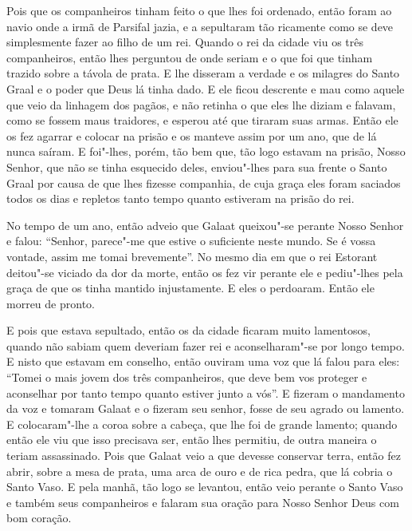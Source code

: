 Pois que os companheiros tinham feito o que lhes foi ordenado, então foram ao
navio onde a irmã de Parsifal jazia, e a sepultaram tão ricamente como se deve
simplesmente fazer ao filho de um rei. Quando o rei da cidade viu os três
companheiros, então lhes perguntou de onde seriam e o que foi que tinham
trazido sobre a távola de prata. E lhe disseram a verdade e os milagres do
Santo Graal e o poder que Deus lá tinha dado. E ele ficou descrente e mau como
aquele que veio da linhagem dos pagãos, e não retinha o que eles lhe diziam e
falavam, como se fossem maus traidores, e esperou até que tiraram suas armas. 
Então ele os fez agarrar e colocar na prisão e os manteve assim por um ano, que
de lá nunca saíram. E foi"-lhes, porém, tão bem que, tão logo estavam na prisão,
Nosso Senhor, que não se tinha esquecido deles, enviou"-lhes para sua frente o
Santo Graal por causa de que lhes fizesse companhia, de cuja graça eles foram
saciados todos os dias e repletos tanto tempo quanto estiveram na prisão do
rei.

No tempo de um ano, então adveio que Galaat queixou"-se perante Nosso Senhor e
falou: “Senhor, parece"-me que estive o suficiente neste mundo. Se é vossa
vontade, assim me tomai brevemente”. No mesmo dia em que o rei Estorant
deitou"-se viciado da dor da morte, então os fez vir perante ele e pediu"-lhes
pela graça de que os tinha mantido injustamente. E eles o perdoaram.
Então ele morreu de pronto. 

E pois que estava sepultado, então os da cidade ficaram muito lamentosos, quando
não sabiam quem deveriam fazer rei e aconselharam"-se por longo tempo. E nisto
que estavam em conselho, então ouviram uma voz que lá falou para eles: “Tomei o
mais jovem dos três companheiros, que deve bem vos proteger e aconselhar por
tanto tempo quanto estiver junto a vós”. E fizeram o mandamento da voz
e tomaram Galaat e o fizeram seu senhor, fosse de seu agrado ou lamento. E
colocaram"-lhe a coroa sobre a cabeça, que lhe foi de grande lamento; quando
então ele viu que isso precisava ser, então lhes permitiu, de outra maneira o
teriam assassinado. Pois que Galaat veio a que devesse conservar terra, então
fez abrir, sobre a mesa de prata, uma arca de ouro e de rica pedra, que lá
cobria o Santo Vaso. E pela manhã, tão logo se levantou, então veio perante o
Santo Vaso e também seus companheiros e falaram sua oração para Nosso Senhor
Deus com bom coração. 

